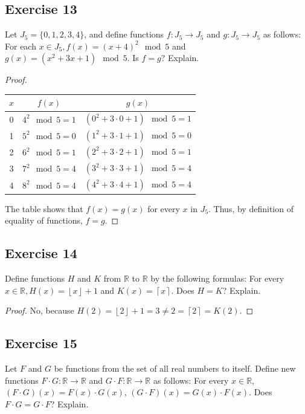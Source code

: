 \documentclass[14pt]{extarticle}
\newcommand{\R}{\mathbb{R}}
\newcommand{\floor}[1]{{\left\lfloor#1\right\rfloor}}
\newcommand{\ceil}[1]{{\left\lceil#1\right\rceil}}
\begin{document}
\subsection{Exercise 13}
Let \(J_5 = \{0, 1, 2, 3, 4\}\), and define functions \(f: J_5 \to J_5\) and \(g: J_5 \to J_5\) as follows: For each 
\(x \in J_5, f(x) = (x + 4)^2 \mod 5\) and \(g(x) = (x^2 + 3x + 1) \mod 5\). Is $f = g$? Explain.

\begin{proof}
\begin{center}
\begin{tabular}{|c|c|c|}
\hline
$x$ & $f(x)$ & $g(x)$ \\
\hline
0 & \(4^2 \mod 5 = 1\) & \((0^2 + 3 \cdot 0 + 1) \mod 5 = 1\) \\
\hline
1 & \(5^2 \mod 5 = 0\) & \((1^2 + 3 \cdot 1 + 1) \mod 5 = 0\) \\
\hline
2 & \(6^2 \mod 5 = 1\) & \((2^2 + 3 \cdot 2 + 1) \mod 5 = 1\) \\
\hline
3 & \(7^2 \mod 5 = 4\) & \((3^2 + 3 \cdot 3 + 1) \mod 5 = 4\) \\
\hline
4 & \(8^2 \mod 5 = 4\) & \((4^2 + 3 \cdot 4 + 1) \mod 5 = 4\) \\
\hline
\end{tabular}
\end{center}

The table shows that \(f(x) = g(x)\) for every $x$ in \(J_5\). Thus, by definition of equality of functions, $f = g$.
\end{proof}

\subsection{Exercise 14}
Define functions $H$ and $K$ from $\R$ to $\R$ by the following formulas: For every \(x \in \R, H(x) = \floor{x} 
+ 1\) and \(K(x) = \ceil{x}\). Does $H = K$? Explain.

\begin{proof}
No, because \(H(2) = \floor{2} + 1 = 3 \neq 2 = \ceil{2} = K(2)\).
\end{proof}

\subsection{Exercise 15}
Let $F$ and $G$ be functions from the set of all real numbers to itself. Define new functions 
\(F \cdot G: \R \to \R\) and \(G \cdot F: \R \to \R\) as follows: For every \(x \in \R\), 
\((F \cdot G)(x) = F(x) \cdot G(x)\), \((G \cdot F)(x) = G(x) \cdot F(x)\). Does $F \cdot G = G \cdot F$? Explain.
\end{document}
